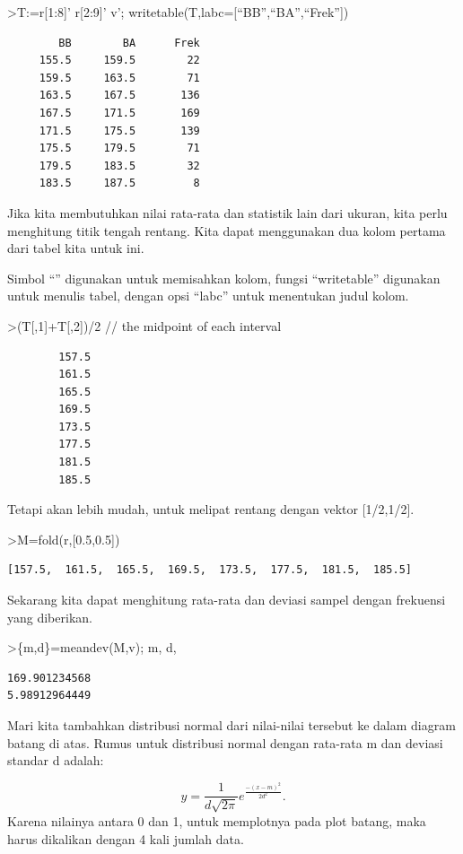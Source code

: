 \documentclass[
]{book}
\begin{document}
\textgreater T:=r{[}1:8{]}' \textbar{} r{[}2:9{]}' \textbar{} v'; writetable(T,labc={[}``BB'',``BA'',``Frek''{]})

\begin{verbatim}
        BB        BA      Frek
     155.5     159.5        22
     159.5     163.5        71
     163.5     167.5       136
     167.5     171.5       169
     171.5     175.5       139
     175.5     179.5        71
     179.5     183.5        32
     183.5     187.5         8
\end{verbatim}

Jika kita membutuhkan nilai rata-rata dan statistik lain dari ukuran, kita perlu menghitung titik tengah rentang. Kita dapat menggunakan dua kolom pertama dari tabel kita untuk ini.

Simbol ``\textbar{}'' digunakan untuk memisahkan kolom, fungsi ``writetable'' digunakan untuk menulis tabel, dengan opsi ``labc'' untuk menentukan judul kolom.

\textgreater(T{[},1{]}+T{[},2{]})/2 // the midpoint of each interval

\begin{verbatim}
        157.5 
        161.5 
        165.5 
        169.5 
        173.5 
        177.5 
        181.5 
        185.5 
\end{verbatim}

Tetapi akan lebih mudah, untuk melipat rentang dengan vektor {[}1/2,1/2{]}.

\textgreater M=fold(r,{[}0.5,0.5{]})

\begin{verbatim}
[157.5,  161.5,  165.5,  169.5,  173.5,  177.5,  181.5,  185.5]
\end{verbatim}

Sekarang kita dapat menghitung rata-rata dan deviasi sampel dengan frekuensi yang diberikan.

\textgreater\{m,d\}=meandev(M,v); m, d,

\begin{verbatim}
169.901234568
5.98912964449
\end{verbatim}

Mari kita tambahkan distribusi normal dari nilai-nilai tersebut ke dalam diagram batang di atas. Rumus untuk distribusi normal dengan rata-rata m dan deviasi standar d adalah:

\[y=\frac{1}{d\sqrt{2\pi}}e^{\frac{-(x-m)^2}{2d^2}}.\]Karena nilainya antara 0 dan 1, untuk memplotnya pada plot batang, maka harus dikalikan dengan 4 kali jumlah data.
\end{document}
